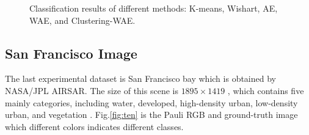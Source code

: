 \documentclass[11pt, a4paper, onecolumn, oneside]{article}
\begin{document}
\begin{figure}
\caption{Classification results of different methods: K-means, Wishart, AE, WAE, and Clustering-WAE.}
\label{fig:nine}
\end{figure}

\subsection{San Francisco Image}

The last experimental dataset is San Francisco bay which is obtained by NASA/JPL AIRSAR. The size of this scene is $1895\times 1419$ , which contains five mainly categories, including water, developed, high-density urban, low-density urban, and vegetation \cite{c}. Fig.\ref{fig:ten} is the Pauli RGB and ground-truth image which different colors indicates different classes.
\end{document}
